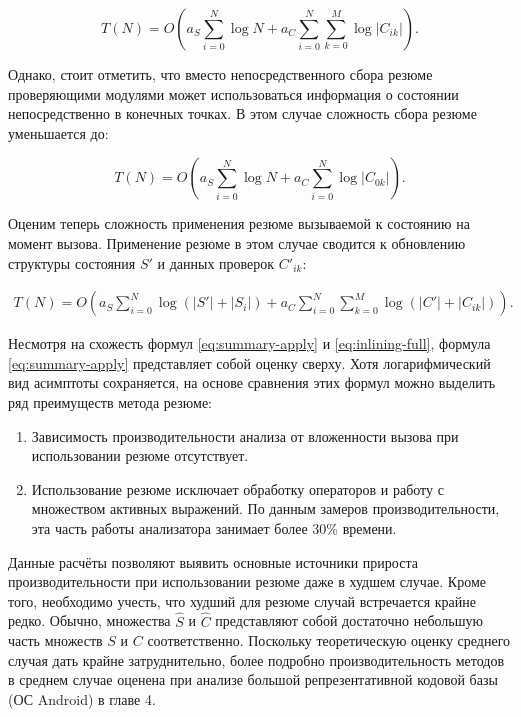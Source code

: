 \begin{equation}
 T(N) = O \left(a_S \sum_{i=0}^N \log N  + a_C \sum_{i=0}^N \sum_{k=0}^M \log |C_{ik}| \right).
\end{equation}

Однако, стоит отметить, что вместо непосредственного сбора резюме проверяющими модулями может использоваться информация о состоянии непосредственно в конечных точках. В этом случае сложность сбора резюме уменьшается до:

\begin{equation}
 T(N) = O \left(a_S \sum_{i=0}^N \log N  + a_C \sum_{i=0}^N  \log |C_{0k}| \right).
\end{equation}

Оценим теперь сложность применения резюме вызываемой к состоянию на момент вызова. Применение резюме в этом случае сводится к обновлению структуры состояния $S'$ и данных проверок $C'_{ik}$:

\begin{equation}
\label{eq:summary-apply}
\begin{split}
 T(N) = O \left( a_S \sum_{i=0}^N \log \left(|S'| + |S_i|\right) +  a_C \sum_{i=0}^N \sum_{k=0}^M  \log \left(|C'|  + |C_{ik}|  \right) \right).
 \end{split}
\end{equation}

Несмотря на схожесть формул \ref{eq:summary-apply} и \ref{eq:inlining-full}, формула \ref{eq:summary-apply} представляет собой оценку сверху. Хотя логарифмический вид асимптоты сохраняется, на основе сравнения этих формул можно выделить ряд преимуществ метода резюме:

\begin{enumerate}
 \item Зависимость производительности анализа от вложенности вызова при использовании резюме отсутствует.
 \item Использование резюме исключает обработку операторов и работу с множеством активных выражений. По данным замеров производительности, эта часть работы анализатора занимает более 30\% времени.
\end{enumerate}

Данные расчёты позволяют выявить основные источники прироста производительности при использовании резюме даже в худшем случае. Кроме того, необходимо учесть, что худший для резюме случай встречается крайне редко. Обычно, множества $\widehat{S}$ и $\widehat{C}$ представляют собой достаточно небольшую часть множеств $S$ и $C$ соответственно. Поскольку теоретическую оценку среднего случая дать крайне затруднительно, более подробно производительность методов в среднем случае оценена при анализе большой репрезентативной кодовой базы (ОС Android) в главе 4.


